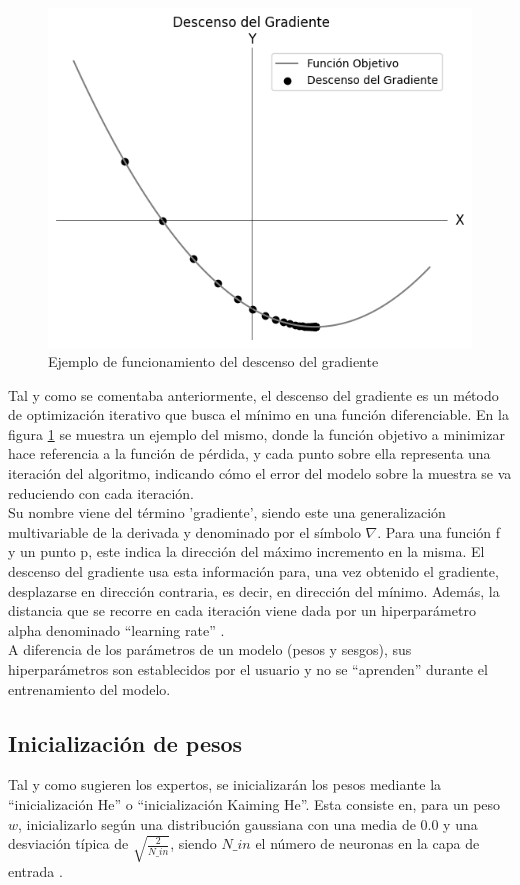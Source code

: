 \begin{figure}[H]
	\centering
	\includegraphics[scale=0.4]{imagenes/sgd.jpg}  
	\caption{Ejemplo de funcionamiento del descenso del gradiente}
	\label{fig:SGD}
\end{figure}

Tal y como se comentaba anteriormente, el descenso del gradiente es un método de optimización iterativo que busca el mínimo en una función diferenciable. En la figura \ref{fig:SGD} se muestra un ejemplo del mismo, donde la función objetivo a minimizar hace referencia a la función de pérdida, y cada punto sobre ella representa una iteración del algoritmo, indicando cómo el error del modelo sobre la muestra se va reduciendo con cada iteración. \\
Su nombre viene del término 'gradiente', siendo este una generalización multivariable de la derivada y denominado por el símbolo $\nabla$. Para una función f y un punto p, este indica la dirección del máximo incremento en la misma. El descenso del gradiente usa esta información para, una vez obtenido el gradiente, desplazarse en dirección contraria, es decir, en dirección del mínimo. Además, la distancia que se recorre en cada iteración viene dada por un hiperparámetro alpha denominado ``learning rate'' \cite{SGD_1} \cite{Gradiente} \cite{SGD_2}. \\
A diferencia de los parámetros de un modelo (pesos y sesgos), sus hiperparámetros son establecidos por el usuario y no se ``aprenden'' durante el entrenamiento del modelo.


\subsection{Inicialización de pesos}
Tal y como sugieren los expertos, se inicializarán los pesos mediante la ``inicialización He'' o ``inicialización Kaiming He''. Esta consiste en, para un peso $w$, inicializarlo según una distribución gaussiana con una media de 0.0 y una desviación típica de $\sqrt{\frac{2}{N\_in}}$, siendo $N\_in$ el número de neuronas en la capa de entrada
\cite{ini_He} \cite{ini_He_2} \cite{ini_He_code} \cite{importancia_ReLU} \cite{importancia_ReLU_2}.

